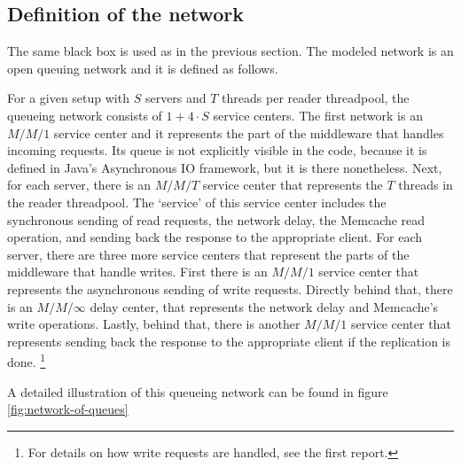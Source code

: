 \documentclass[11pt]{article}
\begin{document}
\subsection{Definition of the network}

The same black box is used as in the previous section.
The modeled network is an open queuing network and it is defined as follows.

For a given setup with $S$ servers and $T$ threads per reader threadpool, the queueing network consists of $1 + 4 \cdot S$ service centers.
The first network is an $M/M/1$ service center and it represents the part of the middleware that handles incoming requests.
Its queue is not explicitly visible in the code, because it is defined in Java's Asynchronous IO framework, but it is there nonetheless.
Next, for each server, there is an $M/M/T$ service center that represents the $T$ threads in the reader threadpool.
The `service' of this service center includes the synchronous sending of read requests, the network delay, the Memcache read operation, and sending back the response to the appropriate client.
For each server, there are three more service centers that represent the parts of the middleware that handle writes.
First there is an $M/M/1$ service center that represents the asynchronous sending of write requests.
Directly behind that, there is an $M/M/\infty$ delay center, that represents the network delay and Memcache's write operations.
Lastly, behind that, there is another $M/M/1$ service center that represents sending back the response to the appropriate client if the replication is done.
\footnote{For details on how write requests are handled, see the first report.}

A detailed illustration of this queueing network can be found in figure \ref{fig:network-of-queues}
\end{document}
